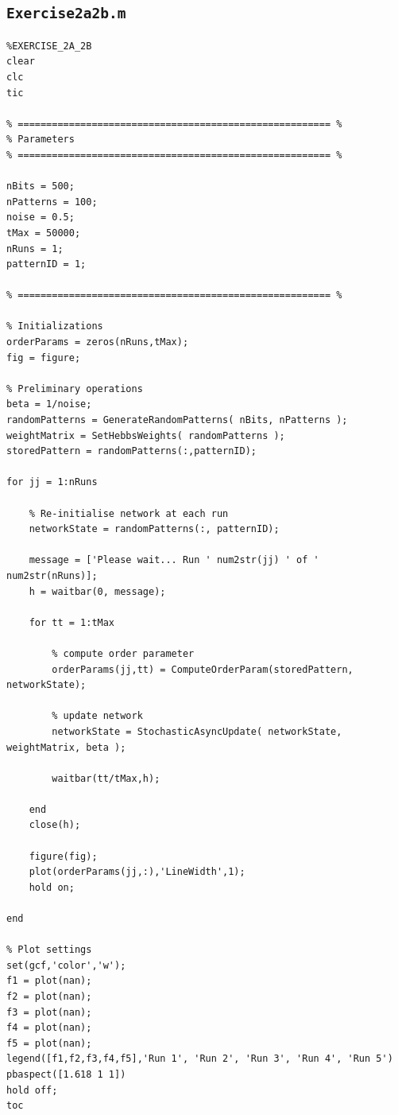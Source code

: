 \documentclass[12pt,A4,titlepage]{article}
\begin{document}
\subsection*{\texttt{Exercise2a2b.m}}
\begin{lstlisting}
%EXERCISE_2A_2B
clear
clc
tic

% ======================================================= %
% Parameters
% ======================================================= %

nBits = 500;
nPatterns = 100;
noise = 0.5;
tMax = 50000;
nRuns = 1;
patternID = 1;

% ======================================================= %

% Initializations
orderParams = zeros(nRuns,tMax);
fig = figure;

% Preliminary operations
beta = 1/noise;
randomPatterns = GenerateRandomPatterns( nBits, nPatterns );
weightMatrix = SetHebbsWeights( randomPatterns );
storedPattern = randomPatterns(:,patternID); 

for jj = 1:nRuns
    
    % Re-initialise network at each run
    networkState = randomPatterns(:, patternID);
   
    message = ['Please wait... Run ' num2str(jj) ' of ' num2str(nRuns)];
    h = waitbar(0, message);
    
    for tt = 1:tMax
    
    	% compute order parameter
    	orderParams(jj,tt) = ComputeOrderParam(storedPattern, networkState);

    	% update network
    	networkState = StochasticAsyncUpdate( networkState, weightMatrix, beta );

    	waitbar(tt/tMax,h);
       
    end
    close(h);
    
    figure(fig);
    plot(orderParams(jj,:),'LineWidth',1);
    hold on;
    
end

% Plot settings
set(gcf,'color','w');
f1 = plot(nan); 
f2 = plot(nan); 
f3 = plot(nan); 
f4 = plot(nan); 
f5 = plot(nan);
legend([f1,f2,f3,f4,f5],'Run 1', 'Run 2', 'Run 3', 'Run 4', 'Run 5')
pbaspect([1.618 1 1])
hold off;
toc
\end{lstlisting}
\end{document}

